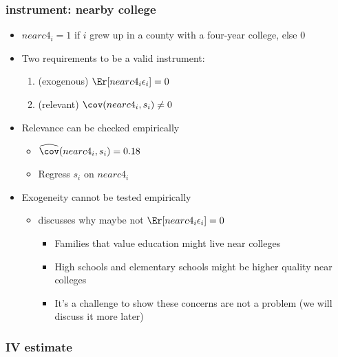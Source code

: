\begin{frame}[allowframebreaks]
  \frametitle{\cite{card1993} instrument: nearby college}
  \begin{itemize}
  \item $nearc4_i = 1$ if $i$ grew up in a county with a four-year
    college, else 0
  \item Two requirements to be a valid instrument:
    \begin{enumerate}
    \item (exogenous) $\Er[nearc4_i \epsilon_i] = 0$
    \item (relevant) $\cov(nearc4_i, s_i) \neq 0$
    \end{enumerate}
  \item Relevance can be checked empirically
    \begin{itemize}
    \item $\widehat{\cov}(nearc4_i,s_i) = 0.18$
    \item Regress $s_i$ on $nearc4_i$
      \begin{center}
        
      \end{center}
    \end{itemize}
  \item Exogeneity cannot be tested empirically
    \begin{itemize}
    \item \cite{card1993} discusses why maybe not $\Er[ nearc4_i
      \epsilon_i ] = 0$
      \begin{itemize}
      \item Families that value education might live near colleges
      \item High schools and elementary schools might be higher
        quality near colleges
      \item It's a challenge to show these concerns are not a problem
        (we will discuss it more later)
      \end{itemize}
    \end{itemize}
  \end{itemize}  
\end{frame}

\begin{frame}[allowframebreaks]
  \frametitle{\cite{card1993} IV estimate}
   
\end{frame}

